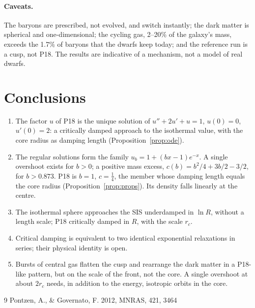 \documentclass[11pt,a4paper]{article}
\theoremstyle{remark}
\newcommand{\rc}{r_c}
\begin{document}
\paragraph{Caveats.} The baryons are prescribed, not evolved, and switch instantly; the
dark matter is spherical and one-dimensional; the cycling gas, 2--20\% of the galaxy's
mass, exceeds the 1.7\% of baryons that the dwarfs keep today; and the reference run is
a cusp, not P18. The results are indicative of a mechanism, not a model of real dwarfs.

\section{Conclusions}
\begin{enumerate}
\item The factor $u$ of P18 is the unique solution of $u''+2u'+u=1$, $u(0)=0$,
  $u'(0)=2$: a critically damped approach to the isothermal value, with the core radius
  as damping length (Proposition~\ref{prop:ode}).
\item The regular solutions form the family $u_b=1+(bx-1)e^{-x}$. A single overshoot
  exists for $b>0$; a positive mass excess, $c(b)=b^2/4+3b/2-3/2$, for $b>0.873$. P18
  is $b=1$, $c=\tfrac14$, the member whose damping length equals the core radius
  (Proposition~\ref{prop:props}). Its density falls linearly at the centre.
\item The isothermal sphere approaches the SIS underdamped in $\ln R$, without a length
  scale; P18 critically damped in $R$, with the scale $\rc$.
\item Critical damping is equivalent to two identical exponential relaxations in
  series; their physical identity is open.
\item Bursts of central gas flatten the cusp and rearrange the dark matter in a P18-like
  pattern, but on the scale of the front, not the core. A single overshoot at about
  $2\rc$ needs, in addition to the energy, isotropic orbits in the core.
\end{enumerate}

\begin{thebibliography}{9}
 Pontzen, A., \& Governato, F. 2012, MNRAS, 421, 3464
\end{thebibliography}
\end{document}
